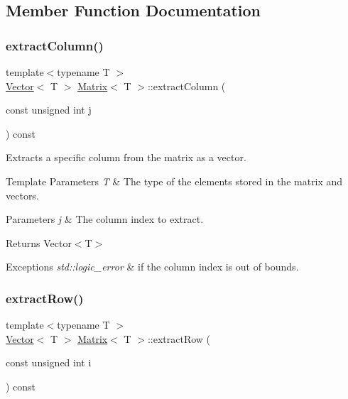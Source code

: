 \subsection{Member Function Documentation}
\mbox{\label{classMatrix_a4361c4478b01f7df1173e5b64eccd127}} 
\subsubsection{\texorpdfstring{extract\+Column()}{extractColumn()}}
{\footnotesize\ttfamily template$<$typename T $>$ \\
\mbox{\hyperlink{classVector}{Vector}}$<$ T $>$ \mbox{\hyperlink{classMatrix}{Matrix}}$<$ T $>$\+::extract\+Column (\begin{DoxyParamCaption}\item[{const unsigned int}]{j }\end{DoxyParamCaption}) const\hspace{0.3cm}{\ttfamily [inline]}}



Extracts a specific column from the matrix as a vector. 


\begin{DoxyTemplParams}{Template Parameters}
{\em T} & The type of the elements stored in the matrix and vectors. \\
\hline
\end{DoxyTemplParams}

\begin{DoxyParams}{Parameters}
{\em j} & The column index to extract. \\
\hline
\end{DoxyParams}
\begin{DoxyReturn}{Returns}
Vector$<$\+T$>$
\end{DoxyReturn}

\begin{DoxyExceptions}{Exceptions}
{\em std\+::logic\+\_\+error} & if the column index is out of bounds. \\
\hline
\end{DoxyExceptions}
\mbox{\label{classMatrix_a7dded77c0f4c424c98858b5f94c13c16}} 
\subsubsection{\texorpdfstring{extract\+Row()}{extractRow()}}
{\footnotesize\ttfamily template$<$typename T $>$ \\
\mbox{\hyperlink{classVector}{Vector}}$<$ T $>$ \mbox{\hyperlink{classMatrix}{Matrix}}$<$ T $>$\+::extract\+Row (\begin{DoxyParamCaption}\item[{const unsigned int}]{i }\end{DoxyParamCaption}) const\hspace{0.3cm}{\ttfamily [inline]}}



